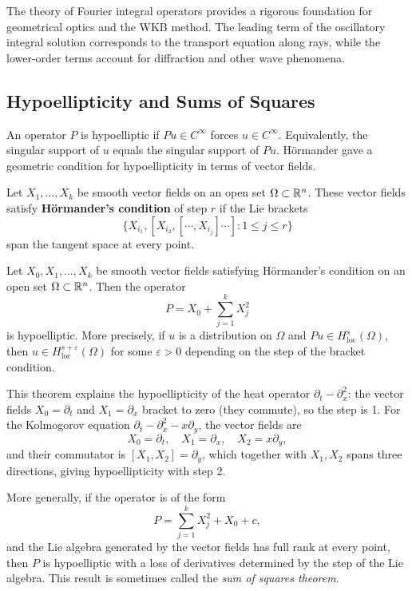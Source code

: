 The theory of Fourier integral operators provides a rigorous foundation
for geometrical optics and the WKB method. The leading term of the
oscillatory integral solution corresponds to the transport equation
along rays, while the lower-order terms account for diffraction and
other wave phenomena.

\subsection{Hypoellipticity and Sums of Squares}

An operator \(P\) is hypoelliptic if \(Pu \in C^\infty\) forces
\(u \in C^\infty\). Equivalently, the singular support of \(u\) equals
the singular support of \(Pu\). H\"ormander gave a geometric condition
for hypoellipticity in terms of vector fields.

\begin{definition}
Let \(X_1, \ldots, X_k\) be smooth vector fields on an open set
\(\Omega \subset \mathbb{R}^n\). These vector fields satisfy
\textbf{H\"ormander's condition} of step \(r\) if the Lie brackets
\[
\{X_{i_1}, [X_{i_2}, [\cdots, X_{i_j}]\cdots] : 1 \leq j \leq r\}
\]
span the tangent space at every point.
\end{definition}

\begin{theorem}
Let \(X_0, X_1, \ldots, X_k\) be smooth vector fields satisfying
H\"ormander's condition on an open set \(\Omega \subset \mathbb{R}^n\). Then
the operator
\[
P = X_0 + \sum_{j=1}^k X_j^2
\]
is hypoelliptic. More precisely, if \(u\) is a distribution on
\(\Omega\) and \(Pu \in H^s_{\text{loc}}(\Omega)\), then
\(u \in H^{s+\varepsilon}_{\text{loc}}(\Omega)\) for some
\(\varepsilon > 0\) depending on the step of the bracket condition.
\end{theorem}

This theorem explains the hypoellipticity of the heat operator
\(\partial_t - \partial_x^2\): the vector fields \(X_0 = \partial_t\) and
\(X_1 = \partial_x\) bracket to zero (they commute), so the step is 1.
For the Kolmogorov equation \(\partial_t - \partial_x^2 - x\partial_y\),
the vector fields are
\[
X_0 = \partial_t, \quad X_1 = \partial_x, \quad X_2 = x\partial_y,
\]
and their commutator is \([X_1, X_2] = \partial_y\), which together with
\(X_1, X_2\) spans three directions, giving hypoellipticity with
step 2.

More generally, if the operator is of the form
\[
P = \sum_{j=1}^k X_j^2 + X_0 + c,
\]
and the Lie algebra generated by the vector fields has full rank at
every point, then \(P\) is hypoelliptic with a loss of derivatives
determined by the step of the Lie algebra. This result is sometimes
called the \textit{sum of squares theorem}.

